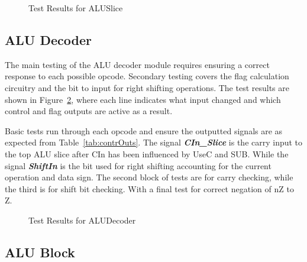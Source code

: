 \begin{figure}[h]
	\caption{Test Results for ALUSlice}
	\label{fig:ALUSliceRes}
\end{figure}

\subsection{ALU Decoder}
The main testing of the ALU decoder module requires ensuring a correct response to each possible opcode. Secondary testing covers the flag calculation circuitry and the bit to input for right shifting operations. The test results are shown in Figure~\ref{fig:ALUDecoderRes}, where each line indicates what input changed and which control and flag outputs are active as a result. 

Basic tests run through each opcode and ensure the outputted signals are as expected from Table~\ref{tab:contrOuts}. The signal {\bf \it CIn\_Slice} is the carry input to the top ALU slice after CIn has been influenced by UseC and SUB. While the signal {\bf \it ShiftIn} is the bit used for right shifting accounting for the current operation and data sign. The second block of tests are for carry checking, while the third is for shift bit checking. With a final test for correct negation of nZ to Z. 

\begin{figure}[h]
	\caption{Test Results for ALUDecoder}
	\label{fig:ALUDecoderRes}
\end{figure}

\subsection{ALU Block}

